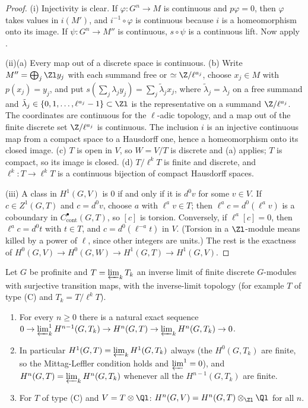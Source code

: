 \begin{proof}
(i) Injectivity is clear. If $\varphi\colon G^n\to M$ is continuous and $p\varphi=0$, then $\varphi$ takes values in $i(M')$, and $i^{-1}\circ\varphi$ is continuous because $i$ is
a homeomorphism onto its image. If $\psi\colon G^n\to M''$ is continuous, $s\circ\psi$ is a continuous lift. Now apply .

(ii)(a) Every map out of a discrete space is continuous. (b) Write $M''=\bigoplus_j\Zl y_j$ with each summand free or $\simeq\Z/\ell^{a_j}$, choose $x_j\in M$ with
$p(x_j)=y_j$, and put $s(\sum_j\lambda_jy_j)=\sum_j\tilde\lambda_jx_j$, where $\tilde\lambda_j=\lambda_j$ on a free summand and $\tilde\lambda_j\in\{0,1,\dots,\ell^{a_j}-1\}\subset\Zl$ is the
representative on a summand $\Z/\ell^{a_j}$. The coordinates are continuous for the $\ell$-adic topology, and a map out of the finite discrete set
$\Z/\ell^{a_j}$ is continuous. The inclusion $i$ is an injective continuous map from a compact space to a Hausdorff one, hence a homeomorphism onto its
closed image. (c) $T$ is open in $V$, so $W=V/T$ is discrete and (a) applies; $T$ is compact, so its image is closed. (d) $T/\ell^kT$ is finite and
discrete, and $\ell^k\colon T\to\ell^kT$ is a continuous bijection of compact Hausdorff spaces.

(iii) A class in $H^1(G,V)$ is $0$ if and only if it is $d^0v$ for some $v\in V$. If $c\in Z^1(G,T)$ and $c=d^0v$, choose $a$ with $\ell^av\in T$; then
$\ell^ac=d^0(\ell^av)$ is a coboundary in $C^\bullet_{\mathrm{cont}}(G,T)$, so $[c]$ is torsion. Conversely, if $\ell^a[c]=0$, then $\ell^ac=d^0t$ with $t\in T$, and $c=d^0(\ell^{-a}t)$ in
$V$. (Torsion in a $\Zl$-module means killed by a power of $\ell$, since other integers are units.) The rest is the exactness of
$H^0(G,V)\to H^0(G,W)\to H^1(G,T)\to H^1(G,V)$.
\end{proof}

\begin{theorem}\label{thm:cohomology:tate-limits}
Let $G$ be profinite and $T=\varprojlim_kT_k$ an inverse limit of finite discrete $G$-modules with surjective transition maps, with the inverse-limit
topology (for example $T$ of type (C) and $T_k=T/\ell^kT$).
\begin{enumerate}[label=(\roman*)]
\item For every $n\ge0$ there is a natural exact sequence $0\to\varprojlim_k^1H^{n-1}(G,T_k)\to H^n(G,T)\to\varprojlim_kH^n(G,T_k)\to0$.
\item In particular $H^1(G,T)=\varprojlim_kH^1(G,T_k)$ always (the $H^0(G,T_k)$ are finite, so the Mittag-Leffler condition holds and $\varprojlim^1=0$), and
$H^n(G,T)=\varprojlim_kH^n(G,T_k)$ whenever all the $H^{n-1}(G,T_k)$ are finite.
\item For $T$ of type (C) and $V=T\otimes\Ql$: $H^n(G,V)=H^n(G,T)\otimes_{\Zl}\Ql$ for all $n$.
\end{enumerate}
\end{theorem}

